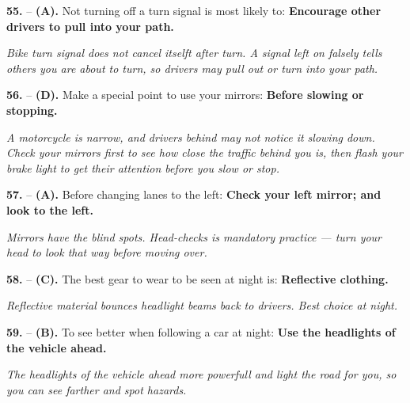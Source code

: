 \begin{minipage}{\linewidth}
\noindent\textbf{55.}  -- \textbf {(A).} Not turning off a turn signal is most likely to:  \textbf {Encourage other drivers to pull into your path.} \par \textit {Bike turn signal does not cancel itselft after turn. A signal left on falsely tells others you are about to turn, so drivers may pull out or turn into your path.} \\
\end{minipage}

\begin{minipage}{\linewidth}
\noindent\textbf{56.}  -- \textbf {(D).} Make a special point to use your mirrors:  \textbf {Before slowing or stopping.} \par \textit {A motorcycle is narrow, and drivers behind may not notice it slowing down. Check your mirrors first to see how close the traffic behind you is, then flash your brake light to get their attention before you slow or stop.} \\
\end{minipage}

\begin{minipage}{\linewidth}
\noindent\textbf{57.}  -- \textbf {(A).} Before changing lanes to the left:  \textbf {Check your left mirror; and look to the left.} \par \textit {Mirrors have the blind spots. Head-checks is mandatory practice — turn your head to look that way before moving over.} \\
\end{minipage}

\begin{minipage}{\linewidth}
\noindent\textbf{58.}  -- \textbf {(C).} The best gear to wear to be seen at night is:  \textbf {Reflective clothing.} \par \textit {Reflective material bounces headlight beams back to drivers. Best choice at night.} \\
\end{minipage}

\begin{minipage}{\linewidth}
\noindent\textbf{59.}  -- \textbf {(B).} To see better when following a car at night:  \textbf {Use the headlights of the vehicle ahead.} \par \textit {The headlights of the vehicle ahead more powerfull and light the road for you, so you can see farther and spot hazards.} \\
\end{minipage}

